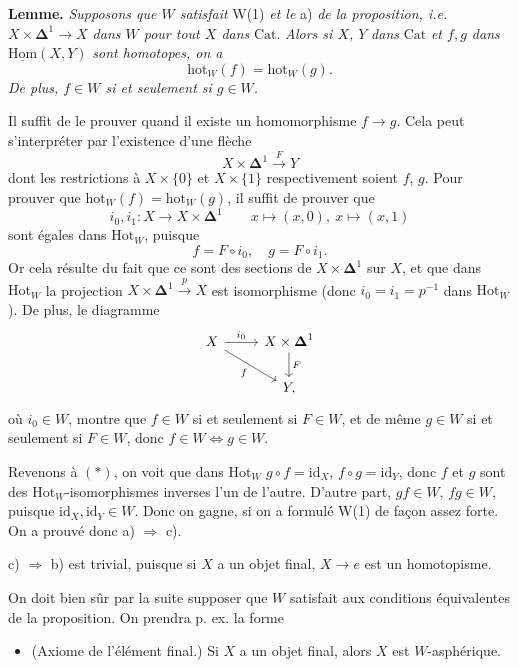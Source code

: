 \documentclass[11pt]{article}
\newcommand{\printedpage}[1]{\marginpar{\footnotesize p.~#1}}
\newcommand{\msp}[1]{\marginpar{\footnotesize [#1]}}
\newcommand{\Hot}{\mathrm{Hot}}
\newcommand{\Cat}{\mathrm{Cat}}
\newcommand{\Dl}{\boldsymbol{\Delta}}
\newcommand{\fl}{\longrightarrow}
\newcommand{\hot}{\mathrm{hot}}
\newcommand{\uHom}{\underline{\mathrm{Hom}}}
\newcommand{\id}{\mathrm{id}}
\begin{document}
\textbf{Lemme.} \textit{Supposons que $W$ satisfait} W(1) \textit{et le} a) \textit{de la proposition, i.e. $X \times \Dl^1 \fl X$ dans $W$ pour tout $X$ dans} $\Cat$. \textit{Alors si $X$, $Y$} \textit{dans} $\Cat$ \textit{et $f, g$ dans} $\uHom(X,Y)$ \textit{sont homotopes, on a}
\[ \hot_W(f) = \hot_W(g). \]
\textit{De plus, $f \in W$ si et seulement si $g \in W$.}

Il suffit de le prouver quand il existe un homomorphisme $f \fl g$. Cela peut s'interpréter par l'existence d'une flèche
\[ X \times \Dl^1 \xrightarrow{F} Y \]
dont les restrictions à $X \times \{0\}$ et $X \times \{1\}$ respectivement soient $f$, $g$. Pour prouver que $\hot_W(f) = \hot_W(g)$, il suffit de prouver que
\[ i_0, i_1 : X \fl X \times \Dl^1 \qquad x \longmapsto (x,0),\ x \longmapsto (x,1) \]
\printedpage{3}
sont égales dans $\Hot_W$, puisque
\[ f = F \circ i_0, \quad g = F \circ i_1. \]
Or cela résulte du fait que ce sont des sections de $X \times \Dl^1$ sur $X$, et que dans $\Hot_W$ la projection $X \times \Dl^1 \xrightarrow{p} X$ est isomorphisme (donc $i_0 = i_1 = p^{-1}$ dans $\Hot_W$). De plus, le diagramme
\[
\begin{tikzcd}
X \arrow[r, "i_0"] \arrow[dr, "f"'] & X \times \Dl^1 \arrow[d, "F"] \\
& Y,
\end{tikzcd}
\]
où $i_0 \in W$, montre que $f \in W$ si et seulement si $F \in W$, et de même $g \in W$ si et seulement si $F \in W$, donc $f \in W \Longleftrightarrow g \in W$.

Revenons à $(*)$, on voit que dans $\Hot_W$ $g \circ f = \id_X$, $f \circ g = \id_Y$, donc $f$ et $g$ sont des $\Hot_W$-isomorphismes inverses l'un de l'autre. D'autre part, $gf \in W$, $fg \in W$, puisque $\id_X, \id_Y \in W$. Donc on gagne, si on a formulé W(1) de façon assez forte. On a prouvé donc a) $\Longrightarrow$ c).

c) $\Longrightarrow$ b) est trivial, puisque si $X$ a un objet final, $X \fl e$ est un homotopisme.

\msp{page 3}

On doit bien sûr par la suite supposer que $W$ satisfait aux conditions équivalentes de la proposition. On prendra p. ex. la forme

\begin{itemize}[leftmargin=*]
\item[\textbf{W(3)}] (Axiome de l'élément final.) Si $X$ a un objet final, alors $X$ est $W$-asphérique.
\end{itemize}
\end{document}
